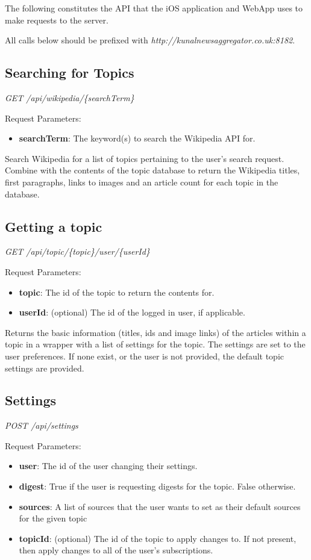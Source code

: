 \documentclass[12pt]{article}
\begin{document}
\begin{appendices}
The following constitutes the API that the iOS application and WebApp uses to make requests to the server.

All calls below should be prefixed with \emph{http://kunalnewsaggregator.co.uk:8182}.

\subsection{Searching for Topics}

\emph{GET	/api/wikipedia/\{searchTerm\}}

Request Parameters:
\begin{itemize}
	\item \textbf{searchTerm}: The keyword(s) to search the Wikipedia API for.
\end{itemize}

Search Wikipedia for a list of topics pertaining to the user's search request. Combine with the contents of the topic database to return the Wikipedia titles, first paragraphs, links to images and an article count for each topic in the database.

\subsection{Getting a topic}

\emph{GET	/api/topic/\{topic\}/user/\{userId\}}

Request Parameters:
\begin{itemize}
	\item \textbf{topic}: The id of the topic to return the contents for.
	\item \textbf{userId}: (optional) The id of the logged in user, if applicable.
\end{itemize}

Returns the basic information (titles, ids and image links) of the articles within a topic in a wrapper with a list of settings for the topic. The settings are set to the user preferences. If none exist, or the user is not provided, the default topic settings are provided.

\subsection{Settings}

\emph{POST	/api/settings}

Request Parameters:
\begin{itemize}
	\item \textbf{user}: The id of the user changing their settings.
	\item \textbf{digest}: True if the user is requesting digests for the topic. False otherwise.
	\item \textbf{sources}: A list of sources that the user wants to set as their default sources for the given topic
	\item \textbf{topicId}: (optional) The id of the topic to apply changes to. If not present, then apply changes to all of the user's subscriptions.
\end{itemize}


\end{appendices}
\end{document}
